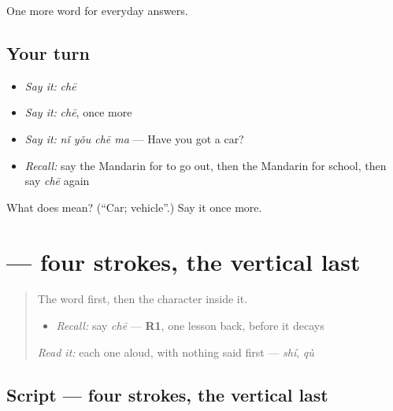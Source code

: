 \begin{grammarlens}[title={What you've built}]
One more word for everyday answers.
\end{grammarlens}

\subsection*{Your turn}
\begin{itemize}
\raggedright
  \item \emph{Say it:} \emph{chē}
  \item \emph{Say it:} \emph{chē}, once more
  \item \emph{Say it:} \emph{nǐ yǒu chē ma} — Have you got a car?
  \item \emph{Recall:} say the Mandarin for to go out, then the Mandarin for school, then say \emph{chē} again
\end{itemize}

\begin{tcolorbox}[breakable,colback=teal!4,colframe=teal!35!black,title={Before you move on}]
What does  mean? (\textquotedblleft{}Car; vehicle\textquotedblright{}.) Say it once more.
\end{tcolorbox}
\section[\texorpdfstring{\zh{车} (chē)}{车 (chē)}]{ — four strokes, the vertical last}

\label{lesson:ZH-W44-che}



\begin{quote}
The word first, then the character inside it.

\begin{itemize}
\raggedright
  \item \emph{Recall:} say \emph{chē} — \textbf{R1}, one lesson back, before it decays
\end{itemize}

\begin{quote}
 
\end{quote}

\emph{Read it:} each one aloud, with nothing said first — \emph{shí}, \emph{qù}
\end{quote}

\subsection*{Script — four strokes, the vertical last}

